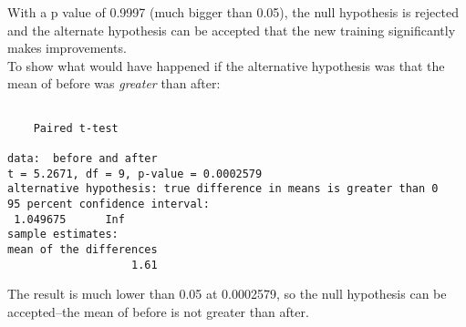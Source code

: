 \documentclass[10pt]{article}
\begin{document}
With a p value of 0.9997 (much bigger than 0.05), the null hypothesis is rejected and  the alternate hypothesis can be accepted that the new training significantly makes improvements.\\
To show what would have happened if the alternative hypothesis was that the mean of before was \textit{greater} than after:
\begin{verbatim}

	Paired t-test

data:  before and after
t = 5.2671, df = 9, p-value = 0.0002579
alternative hypothesis: true difference in means is greater than 0
95 percent confidence interval:
 1.049675      Inf
sample estimates:
mean of the differences 
                   1.61 
\end{verbatim}
The result is much lower than 0.05 at 0.0002579, so the null hypothesis can be accepted--the mean of before is not greater than after.
\end{document}
